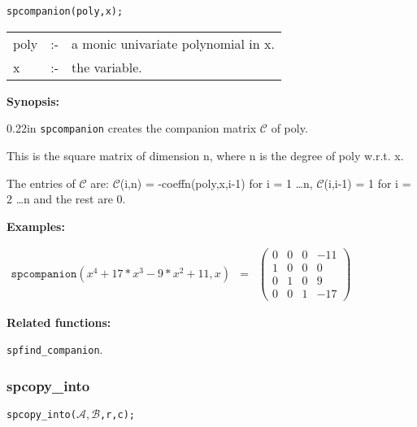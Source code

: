 \hspace*{0.175in} \texttt{spcompanion(poly,x);}

\hspace*{0.1in} 
\begin{tabular}{l l l}
poly &:-& a monic univariate polynomial in x. \\
x    &:-& the variable.
\end{tabular}

\textbf{Synopsis:}

\begin{addtolength}{\leftskip}{0.22in}
                \texttt{spcompanion} creates the companion matrix $\mathcal{C}$
                of poly. 

This is the square matrix of dimension n, where n is the degree of poly 
w.r.t. x.

The entries of $\mathcal{C}$ are: 
                $\mathcal{C}$(i,n) = -coeffn(poly,x,i-1) for i = 1 
                \ldots n, $\mathcal{C}$(i,i-1) = 1 for i = 2 \ldots n and 
                the rest are 0.

\end{addtolength}


\textbf{Examples:}

\begin{flushleft}  
\hspace*{0.1in}
\begin{math}  
\begin{array}{ccc}
\texttt{spcompanion}(x^4+17*x^3-9*x^2+11,x) & = & 
\left( \begin{array}{cccc} 0 & 0 & 0 & -11 \\ 1 & 0 & 0 & 0 \\ 
0 & 1 & 0 & 9 \\ 0 & 0 & 1 & -17 
\end{array} \right)
\end{array}
\end{math}  
\end{flushleft}

\textbf{Related functions:}

\hspace*{0.175in} \texttt{spfind\_companion}.


\subsubsection{spcopy\_into}

\hspace*{0.175in} \texttt{spcopy\_into($\mathcal{A,B}$,r,c);}

